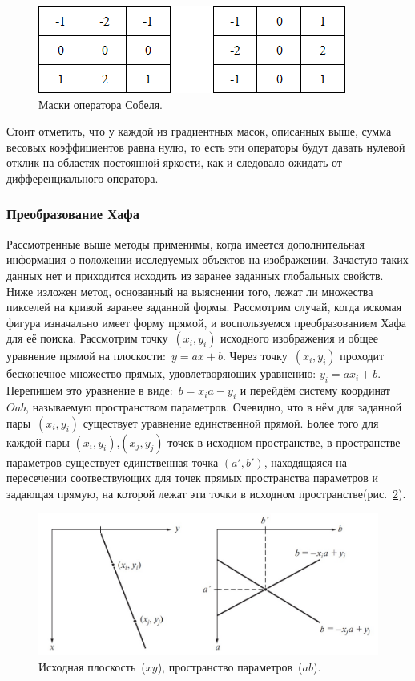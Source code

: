 \documentclass[12pt,a4paper]{article} %
\begin{document}
\begin{figure}[h]
	
	\centering
	
	\includegraphics[width=0.4\linewidth]{grad_mask_sob.jpg}
	
	\caption{Маски оператора Собеля.}
	
	\label{fig:grad_mask_sob}
	
\end{figure}

Стоит отметить, что у каждой из градиентных масок, описанных выше, сумма весовых коэффициентов равна нулю, то есть эти операторы будут давать нулевой отклик на областях постоянной яркости, как и следовало ожидать от дифференциального оператора.

\subsubsection{Преобразование Хафа}

Рассмотренные выше методы применимы, когда имеется дополнительная информация о положении исследуемых объектов на изображении. Зачастую таких данных нет и приходится исходить из заранее заданных глобальных свойств. Ниже изложен метод, основанный на выяснении того, лежат ли множества пикселей на кривой заранее заданной формы.
Рассмотрим случай, когда искомая фигура изначально имеет форму прямой, и воспользуемся преобразованием Хафа для её поиска.
Рассмотрим точку~$(x_i, y_i)$ исходного изображения и общее уравнение прямой на плоскости:~$y = ax+b$. Через точку~$(x_i, y_i)$ проходит бесконечное множество прямых, удовлетворяющих уравнению: $y_i = ax_i+b$. Перепишем это уравнение в виде:~$b = x_i a - y_i$ и перейдём систему координат $Oab$, называемую пространством параметров. Очевидно, что в нём для заданной пары~$(x_i, y_i)$ существует уравнение единственной прямой. Более того для каждой пары $(x_i, y_i)$,$(x_j, y_j)$ точек в исходном пространстве, в пространстве параметров существует единственная точка $(a', b')$, находящаяся на пересечении соотвествующих для точек прямых пространства параметров и задающая прямую, на которой лежат эти точки в исходном пространстве(рис.~\ref{fig:param_haf}).

\begin{figure}[h]
	
	\centering
	
	\includegraphics[width=0.6\linewidth]{param_haf.jpg}
	
	\caption{Исходная плоскость~($xy$), пространство параметров~($ab$).}
	
	\label{fig:param_haf}
	
\end{figure}
\end{document}
